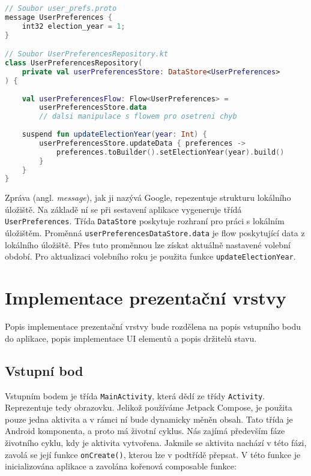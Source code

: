 \begin{lstlisting}[caption={Ukázka práce s Proto DataStore}, label={lst:proto-datastore}, tabsize=2, language=Kotlin]
// Soubor user_prefs.proto
message UserPreferences {
	int32 election_year = 1;
}

// Soubor UserPreferencesRepository.kt
class UserPreferencesRepository(
	private val userPreferencesStore: DataStore<UserPreferences>
) {
	
	val userPreferencesFlow: Flow<UserPreferences> = 
		userPreferencesStore.data
		// dalsi manipulace s flowem pro osetreni chyb
	
	suspend fun updateElectionYear(year: Int) {
		userPreferencesStore.updateData { preferences ->
			preferences.toBuilder().setElectionYear(year).build()
		}
	}
}
\end{lstlisting}

\noindent Zpráva (angl. \textit{message}), jak ji nazývá Google, repezentuje strukturu lokálního úložiště. Na základě ní se při sestavení aplikace vygeneruje třídá \lstinline|UserPreferences|. Třída \lstinline|DataStore| poskytuje rozhraní pro práci s lokálním úložištěm. Proměnná \lstinline|userPreferencesDataStore.data| je flow poskytující data z lokálního úložiště. Přes tuto proměnnou lze získat aktuálně nastavené volební období. Pro aktualizaci volebního roku je použita funkce \lstinline|updateElectionYear|.

\section {Implementace prezentační vrstvy}
Popis implementace prezentační vrstvy bude rozdělena na popis vstupního bodu do \linebreak aplikace, popis implementace UI elementů a popis držitelů stavu.

\subsection*{Vstupní bod}
Vstupním bodem je třída \lstinline|MainActivity|, která dědí ze třídy \lstinline|Activity|. Reprezentuje tedy obrazovku. Jelikož používáme Jetpack Compose, je použita pouze jedna aktivita a v rámci ní bude dynamicky měněn obsah. Tato třída je Android komponenta, a proto má životní cyklus. Nás zajímá především fáze životního cyklu, kdy je aktivita vytvořena. Jakmile se aktivita nachází v této fázi, zavolá se její funkce \lstinline|onCreate()|, kterou lze v podtřídě přepsat. V této funkce je inicializována aplikace a zavolána kořenová composable funkce:

